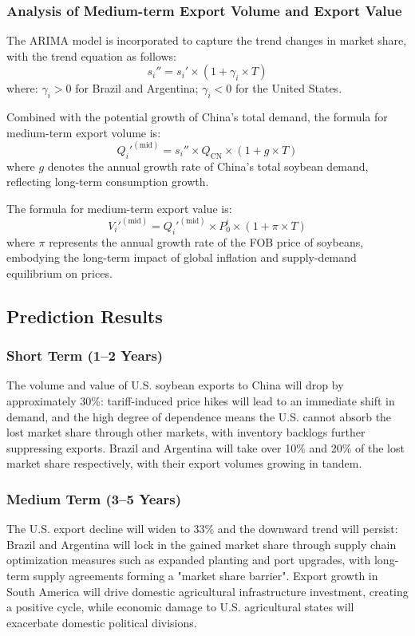 \documentclass{apmcmthesis}
\begin{document}
\subsubsection{Analysis of Medium-term Export Volume and Export Value}
The ARIMA model is incorporated to capture the trend changes in market share, with the trend equation as follows:
\begin{equation}
s_{i}'' = s_{i}' \times \left(1 + \gamma_{i} \times T\right)
\end{equation}
where:
$\gamma_{i} > 0$ for Brazil and Argentina;
$\gamma_{i} < 0$ for the United States.

Combined with the potential growth of China's total demand, the formula for medium-term export volume is:
\begin{equation}
Q_{i}'^{(\text{mid})} = s_{i}'' \times Q_{\text{CN}} \times (1 + g \times T)
\end{equation}
where $g$ denotes the annual growth rate of China's total soybean demand, reflecting long-term consumption growth.

The formula for medium-term export value is:
\begin{equation}
V_{i}'^{(\text{mid})} = Q_{i}'^{(\text{mid})} \times P_{0}^{i} \times (1 + \pi \times T)
\end{equation}
where $\pi$ represents the annual growth rate of the FOB price of soybeans, embodying the long-term impact of global inflation and supply-demand equilibrium on prices.



\subsection{Prediction Results}
\subsubsection{Short Term (1–2 Years)}
The volume and value of U.S. soybean exports to China will drop by approximately 30\%: tariff-induced price hikes will lead to an immediate shift in demand, and the high degree of dependence means the U.S. cannot absorb the lost market share through other markets, with inventory backlogs further suppressing exports. Brazil and Argentina will take over 10\% and 20\% of the lost market share respectively, with their export volumes growing in tandem.

\subsubsection{Medium Term (3–5 Years)}
The U.S. export decline will widen to 33\% and the downward trend will persist: Brazil and Argentina will lock in the gained market share through supply chain optimization measures such as expanded planting and port upgrades, with long-term supply agreements forming a "market share barrier". Export growth in South America will drive domestic agricultural infrastructure investment, creating a positive cycle, while economic damage to U.S. agricultural states will exacerbate domestic political divisions.
\end{document}
